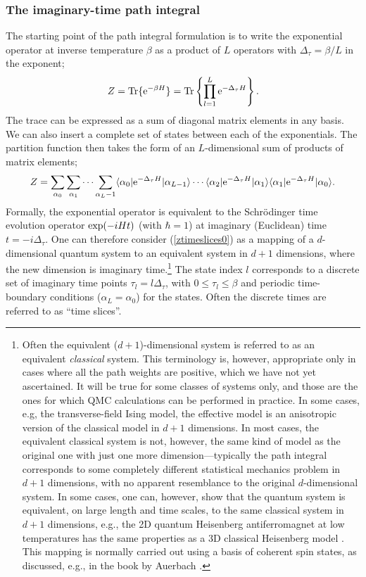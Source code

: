 \documentclass[draft,numberedheadings]{aipproc}
\begin{document}
\subsubsection{The imaginary-time path integral}

The starting point of the path integral formulation is to write the exponential operator at inverse temperature $\beta$ as a product of $L$ operators 
with $\Delta_\tau=\beta/L$ in the exponent;
\begin{equation}
Z = {\rm Tr}\{ {\rm e}^{-\beta H} \} =  {\rm Tr}\left \{ \prod_{l=1}^L {\rm e}^{-\Delta_\tau H} \right \}.
\end{equation}
The trace can be expressed as a sum of diagonal matrix elements in any basis. We can also insert a complete set of states between each of the 
exponentials. The partition function then takes the form of an $L$-dimensional sum of products of matrix elements;
\begin{equation}
Z = \sum_{\alpha_0}\sum_{\alpha_1} \cdots \sum_{\alpha_L-1}
\langle \alpha_0|{\rm e}^{-\Delta_\tau H}|\alpha_{L-1}\rangle \cdots
\langle \alpha_2|{\rm e}^{-\Delta_\tau H}|\alpha_1\rangle 
\langle \alpha_{1}|{\rm e}^{-\Delta_\tau H}|\alpha_0\rangle.
\label{ztimeslices0}
\end{equation}
Formally, the exponential operator is equivalent to the Schr\"odinger time evolution operator ${\rm exp}{(-iHt)}$ (with $\hbar=1$) at imaginary (Euclidean)
time $t=-i\Delta_\tau$. One can therefore consider (\ref{ztimeslices0}) as a mapping of a $d$-dimensional quantum system to an equivalent system in $d+1$ 
dimensions, where the new dimension is imaginary time.\footnote{Often the equivalent ($d+1$)-dimensional system is referred to as an equivalent {\it classical} 
system. This terminology is, however, appropriate only in cases where all the path weights are positive, which we have not yet ascertained. It will be true for 
some classes of systems only, and those are the ones for which QMC calculations can be performed in practice. In some cases, e.g, the 
transverse-field Ising model, the effective model is an anisotropic version of the classical model in $d+1$ dimensions. In most cases, the equivalent 
classical system is not, however, the same kind of model as the original one with just one more dimension---typically the path integral corresponds to some 
completely different statistical mechanics problem in $d+1$ dimensions, with no apparent resemblance to the original $d$-dimensional system. In some cases, 
one can, however, show that the quantum system is equivalent, on large length and time scales, to the same classical system in $d+1$ dimensions, e.g., 
the 2D quantum Heisenberg antiferromagnet at low temperatures has the same properties as a 3D classical Heisenberg model \cite{chn}. This mapping is 
normally carried out using a basis of coherent spin states, as discussed, e.g., in the book by Auerbach \cite{auerbachbook}.}
The state index $l$ corresponds to a discrete set of imaginary time points $\tau_l=l\Delta_\tau$, with $0\le \tau_l \le \beta$ and periodic time-boundary 
conditions ($\alpha_L=\alpha_0$) for the states. Often the discrete times are referred to as ``time slices''. 
\end{document}

